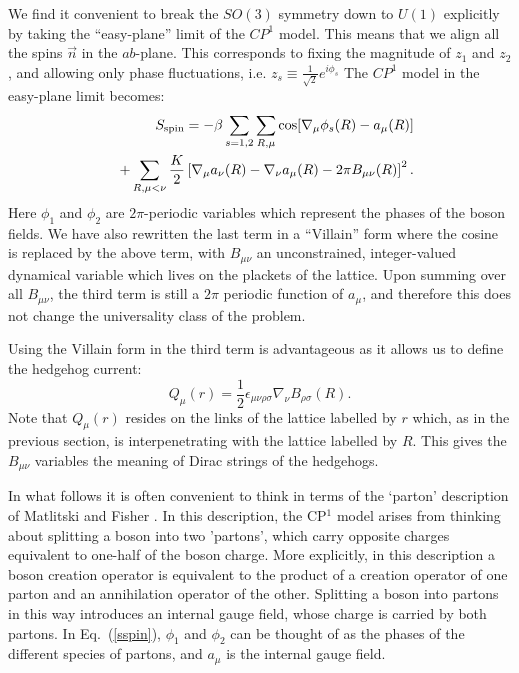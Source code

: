 \documentclass[prb,twocolumn]{revtex4-1}
\begin{document}
We find it convenient to break the $SO(3)$ symmetry down to $U(1)$ explicitly by taking the ``easy-plane'' limit of the $CP^1$ model. This means that we align all the spins $\vec{n}$ in the $ab$-plane. This corresponds to fixing the magnitude of $z_1$ and $z_2$, and allowing only phase fluctuations, i.e. $z_s\equiv \frac{1}{\sqrt{2}}e^{i\phi_s}$ The $CP^1$ model in the easy-plane limit becomes:
\begin{eqnarray}
&&S_{\rm spin}=-\beta\sum_{s=1,2}\sum_{R,\mu} \cos[\nabla_\mu\phi_s(R)-a_\mu(R)]\nonumber\\
&&+\sum_{R,\mu<\nu}\frac{K}{2}\left[\nabla_\mu a_\nu(R)-\nabla_\nu a_\mu(R)-2\pi B_{\mu\nu}(R)\right]^2.
\label{sspin}
\end{eqnarray}
Here $\phi_1$ and $\phi_2$ are $2\pi$-periodic variables which represent the phases of the boson fields. We have also rewritten the last term in a ``Villain'' form where the cosine is replaced by the above term, with $B_{\mu\nu}$ an unconstrained, integer-valued dynamical variable which lives on the plackets of the lattice. Upon summing over all $B_{\mu\nu}$, the third term is still a $2\pi$ periodic function of $a_{\mu}$, and therefore this does not change the universality class of the problem.

Using the Villain form in the third term is advantageous as it allows us to define the hedgehog current:
\begin{equation}
Q_\mu(r)=\frac{1}{2}\epsilon_{\mu\nu\rho\sigma}\nabla_\nu B_{\rho\sigma}(R).
\label{mondef}
\end{equation}
Note that $Q_\mu(r)$ resides on the links of the lattice labelled by $r$ which, as in the previous section, is interpenetrating with the lattice labelled by $R$. This gives the $B_{\mu\nu}$ variables the meaning of Dirac strings of the hedgehogs.

In what follows it is often convenient to think in terms of the `parton' description of Matlitski and Fisher \cite{Max}. In this description, the CP$^1$ model arises from thinking about splitting a boson into two 'partons', which carry opposite charges equivalent to one-half of the boson charge. More explicitly, in this description a boson creation operator is equivalent to the product of a creation operator of one parton and an annihilation operator of the other. Splitting a boson into partons in this way introduces an internal gauge field, whose charge is carried by both partons. In Eq.~(\ref{sspin}), $\phi_1$ and $\phi_2$ can be thought of as the phases of the different species of partons, and $a_\mu$ is the internal gauge field. 
\end{document}
